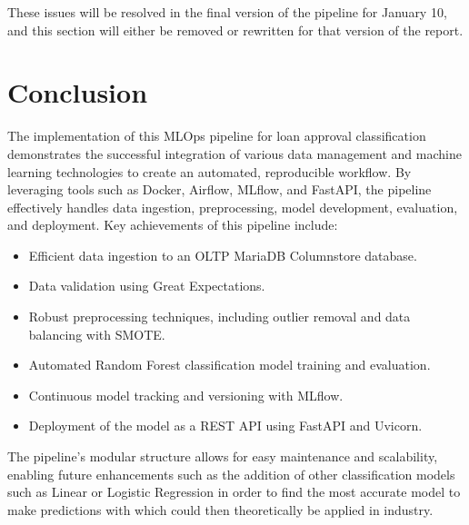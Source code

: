 \documentclass[12pt]{report}
\newcommand{\para}{\vspace{7pt}\noindent}
\begin{document}
\para These issues will be resolved in the final version of the pipeline for January 10, and this section will either 
be removed or rewritten for that version of the report. 

\chapter*{Conclusion}
The implementation of this MLOps pipeline for loan approval classification demonstrates the successful integration of various
data management and machine learning technologies to create an automated, reproducible workflow. By leveraging tools such as Docker,
Airflow, MLflow, and FastAPI, the pipeline effectively handles data ingestion, preprocessing, model development, evaluation, and 
deployment. Key achievements of this pipeline include:

\begin{itemize}
    \item Efficient data ingestion to an OLTP MariaDB Columnstore database.
    \item Data validation using Great Expectations.
    \item Robust preprocessing techniques, including outlier removal and data balancing with SMOTE.
    \item Automated Random Forest classification model training and evaluation.
    \item Continuous model tracking and versioning with MLflow.
    \item Deployment of the model as a REST API using FastAPI and Uvicorn.
\end{itemize}

The pipeline's modular structure allows for easy maintenance and scalability, enabling future enhancements such as the addition 
of other classification models such as Linear or Logistic Regression in order to find the most accurate model to make predictions with 
which could then theoretically be applied in industry.
   

% 

\end{document}
